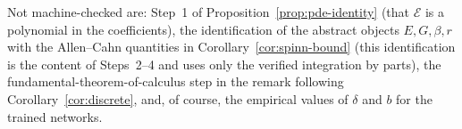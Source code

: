 Not machine-checked are: Step~1 of Proposition~\ref{prop:pde-identity} (that $\mathcal{E}$ is a polynomial in the coefficients), the identification of the abstract objects $E,G,\beta,r$ with the Allen--Cahn quantities in Corollary~\ref{cor:spinn-bound} (this identification is the content of Steps~2--4 and uses only the verified integration by parts), the fundamental-theorem-of-calculus step in the remark following Corollary~\ref{cor:discrete}, and, of course, the empirical values of $\delta$ and $b$ for the trained networks.
